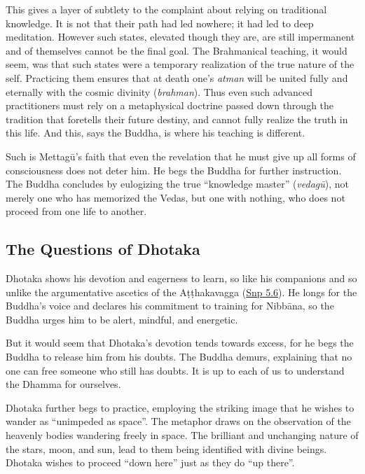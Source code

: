 \documentclass[12pt,openany]{book}%
\begin{document}
This gives a layer of subtlety to the complaint about relying on traditional knowledge. It is not that their path had led nowhere; it had led to deep meditation. However such states, elevated though they are, are still impermanent and of themselves cannot be the final goal. The Brahmanical teaching, it would seem, was that such states were a temporary realization of the true nature of the self. Practicing them ensures that at death one’s \textit{atman} will be united fully and eternally with the cosmic divinity (\textit{brahman}). Thus even such advanced practitioners must rely on a metaphysical doctrine passed down through the tradition that foretells their future destiny, and cannot fully realize the truth in this life. And this, says the Buddha, is where his teaching is different.

Such is \textsanskrit{Mettagū}’s faith that even the revelation that he must give up all forms of consciousness does not deter him. He begs the Buddha for further instruction. The Buddha concludes by eulogizing the true “knowledge master” (\textit{\textsanskrit{vedagū}}), not merely one who has memorized the Vedas, but one with nothing, who does not proceed from one life to another.

\subsection*{The Questions of Dhotaka}

Dhotaka shows his devotion and eagerness to learn, so like his companions and so unlike the argumentative ascetics of the \textsanskrit{Aṭṭhakavagga} (\href{https://suttacentral.net/snp5.6/en/sujato}{Snp 5.6}). He longs for the Buddha’s voice and declares his commitment to training for \textsanskrit{Nibbāna}, so the Buddha urges him to be alert, mindful, and energetic.

But it would seem that Dhotaka’s devotion tends towards excess, for he begs the Buddha to release him from his doubts. The Buddha demurs, explaining that no one can free someone who still has doubts. It is up to each of us to understand the Dhamma for ourselves.

Dhotaka further begs to practice, employing the striking image that he wishes to wander as “unimpeded as space”. The metaphor draws on the observation of the heavenly bodies wandering freely in space. The brilliant and unchanging nature of the stars, moon, and sun, lead to them being identified with divine beings. Dhotaka wishes to proceed “down here” just as they do “up there”.
\end{document}
